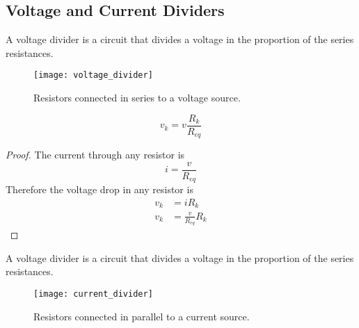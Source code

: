 \documentclass{article}
\begin{document}
\subsection{Voltage and Current Dividers}
\begin{definition}
    A voltage divider is a circuit that divides a voltage in the proportion of the series resistances.
\end{definition}
\begin{figure}[H]
    \centering
    \texttt{[image: voltage\_divider]}
    \caption{Resistors connected in series to a voltage source.}
\end{figure}
\begin{theorem}
    \begin{equation*}
        v_k = v \frac{R_k}{R_{eq}}
    \end{equation*}
\end{theorem}
\begin{proof}
    The current through any resistor is
    \begin{equation*}
        i = \frac{v}{R_{eq}}
    \end{equation*}
    Therefore the voltage drop in any resistor is
    \begin{align*}
        v_k & = i R_k                \\
        v_k & = \frac{v}{R_{eq}} R_k
    \end{align*}
\end{proof}
\begin{definition}
    A voltage divider is a circuit that divides a voltage in the proportion of the series resistances.
\end{definition}
\begin{figure}[H]
    \centering
    \texttt{[image: current\_divider]}
    \caption{Resistors connected in parallel to a current source.}
\end{figure}
\end{document}
